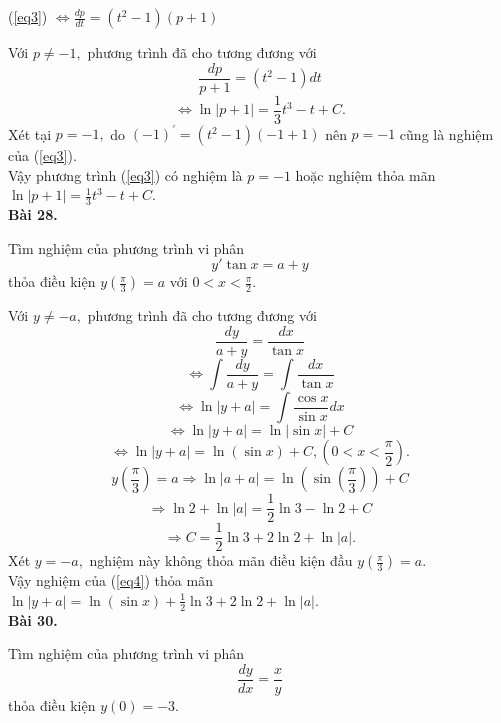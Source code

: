 \documentclass[12pt,a4paper]{article}
\begin{document}
\begin{center}
(\ref{eq3}) \( \Leftrightarrow \frac{{dp}}{{dt}} = \left( {{t^2} - 1} \right)\left( {p + 1} \right)\)
\end{center}
Với \(p \ne  - 1,\) phương trình đã cho tương đương với
\[\frac{{dp}}{{p + 1}} = \left( {{t^2} - 1} \right)dt\]
\[ \Leftrightarrow \ln \left| {p + 1} \right| = \frac{1}{3}{t^3} - t + C.\]
Xét tại \(p = -1,\) do \({\left( { - 1} \right)^\prime } = \left( {{t^2} - 1} \right)\left( { - 1 + 1} \right)\) nên \(p = -1\) cũng là nghiệm của (\ref{eq3}).\\
Vậy phương trình (\ref{eq3}) có nghiệm là \(p = -1\) hoặc nghiệm thỏa mãn \(\ln \left| {p + 1} \right| = \frac{1}{3}{t^3} - t + C.\)\\
\textbf{Bài 28.}
\begin{mybox}
Tìm nghiệm của phương trình vi phân 
\begin{equation}
\label{eq4}
y'\tan x = a + y
\end{equation}
thỏa điều kiện \(y\left( {\frac{\pi }{3}} \right) = a\) với \(0 < x < \frac{\pi }{2}.\)
\end{mybox}
Với \(y \ne  - a,\) phương trình đã cho tương đương với
\[\frac{{dy}}{{a + y}} = \frac{{dx}}{{\tan x}}\]
\[ \Leftrightarrow \int {\frac{{dy}}{{a + y}} = \int {\frac{{dx}}{{\tan x}}} } \]
\[ \Leftrightarrow \ln \left| {y + a} \right| = \int {\frac{{\cos x}}{{\sin x}}dx} \]
\[ \Leftrightarrow \ln \left| {y + a} \right| = \ln \left| {\sin x} \right| + C\]
\[ \Leftrightarrow \ln \left| {y + a} \right| = \ln \left( {\sin x} \right) + C,\left( {0 < x < \frac{\pi }{2}} \right).\]
\[y\left( {\frac{\pi }{3}} \right) = a \Rightarrow \ln \left| {a + a} \right| = \ln \left( {\sin \left( {\frac{\pi }{3}} \right)} \right) + C\]
\[ \Rightarrow \ln 2 + \ln \left| a \right| = \frac{1}{2}\ln 3 - \ln 2 + C\]
\[ \Rightarrow C = \frac{1}{2}\ln 3 + 2\ln 2 + \ln \left| a \right|.\]
Xét \(y = -a,\) nghiệm này không thỏa mãn điều kiện đầu \(y\left( {\frac{\pi }{3}} \right) = a.\) \\
Vậy nghiệm của (\ref{eq4}) thỏa mãn \(\ln \left| {y + a} \right| = \ln \left( {\sin x} \right) + \frac{1}{2}\ln 3 + 2\ln 2 + \ln \left| a \right|.\)\\
\textbf{Bài 30.}
\begin{mybox}
Tìm nghiệm của phương trình vi phân 
\begin{equation}
\frac{{dy}}{{dx}} = \frac{x}{y}
\label{eq5}
\end{equation}
thỏa điều kiện \(y\left( 0 \right) =  - 3.\)
\end{mybox}
\end{document}
